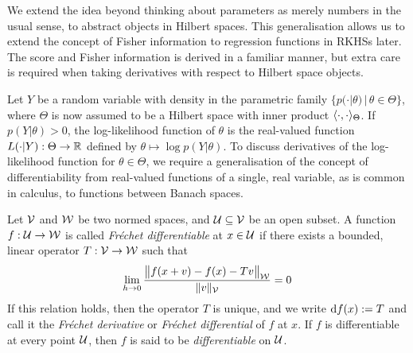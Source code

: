 
We extend the idea beyond thinking about parameters as merely numbers in the usual sense, to abstract objects in Hilbert spaces. 
This generalisation allows us to extend the concept of Fisher information to regression functions in RKHSs later.
The score and Fisher information is derived in a familiar manner, but extra care is required when taking derivatives with respect to Hilbert space objects.  

Let $Y$ be a random variable with density in the parametric family $\{p(\cdot|\theta) \,|\, \theta \in \Theta \}$, where $\Theta$ is now assumed to be a Hilbert space with inner product $\langle\cdot,\cdot\rangle_\Theta$.
If $p(Y|\theta) > 0$, the log-likelihood function of $\theta$ is the real-valued function $L(\cdot|Y):\Theta\to\mathbb{R}$ defined by $\theta \mapsto \log p(Y|\theta)$. 
To discuss derivatives of the log-likelihood function for $\theta\in\Theta$, we require a generalisation of the concept of differentiability from real-valued functions of a single, real variable, as is common in calculus, to functions between Banach spaces.


\begin{definition}
  Let ${\mathcal V}$ and ${\mathcal W}$ be two normed spaces, and ${\mathcal U} \subseteq {\mathcal V}$ be an open subset.
  A function $f:{\mathcal U}\to{\mathcal W}$ is called \emph{Fréchet differentiable} at $x \in {\mathcal U}$ if there exists a bounded, linear operator $T:{\mathcal V}\to{\mathcal W}$ such that 
  \[
    \lim_{h\to 0} \frac{\big\Vert f(x+v) - f(x) - T v \big\Vert_{{\mathcal W}}}{\lVert v\rVert_{\mathcal V}} = 0
  \]
  If this relation holds, then the operator $T$ is unique, and we write $\text{d} f(x) := T$ and call it the \emph{Fréchet derivative} or \emph{Fréchet differential} of $f$ at $x$.
  If $f$ is differentiable at every point ${\mathcal U}$, then $f$ is said to be \emph{differentiable} on ${\mathcal U}$.
\end{definition}

